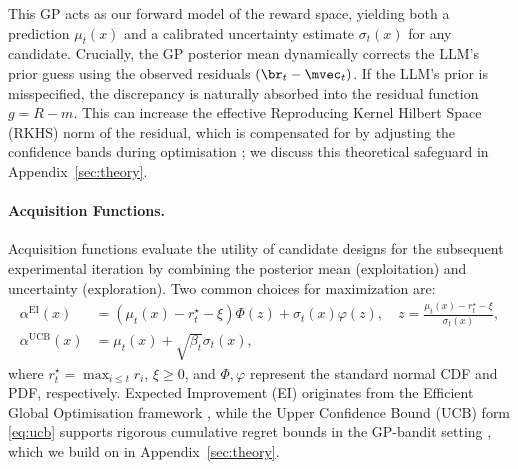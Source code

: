 This GP acts as our forward model of the reward space, yielding both a prediction $\mu_t(x)$ and a calibrated uncertainty estimate $\sigma_t(x)$ for any candidate. Crucially, the GP posterior mean dynamically corrects the LLM’s prior guess using the observed residuals $(\br_t - \mvec_t)$. If the LLM’s prior is misspecified, the discrepancy is naturally absorbed into the residual function $g = R - m$. This can increase the effective Reproducing Kernel Hilbert Space (RKHS) norm of the residual, which is compensated for by adjusting the confidence bands during optimisation \citep{srinivas2010gaussian,chowdhury2017kernelized}; we discuss this theoretical safeguard in Appendix~\ref{sec:theory}.

\paragraph{Acquisition Functions.}
Acquisition functions evaluate the utility of candidate designs for the subsequent experimental iteration by combining the posterior mean (exploitation) and uncertainty (exploration). Two common choices for maximization are:
\begin{align}
\alpha^{\mathrm{EI}}(x) &= (\mu_t(x) - r_t^\star - \xi) \Phi(z) + \sigma_t(x) \varphi(z),
   \quad z = \tfrac{\mu_t(x) - r_t^\star - \xi}{\sigma_t(x)}, \label{eq:ei}\\
\alpha^{\mathrm{UCB}}(x) &= \mu_t(x) + \sqrt{\beta_t} \sigma_t(x), \label{eq:ucb}
\end{align}
where $r_t^\star = \max_{i \le t} r_i$, $\xi \ge 0$, and $\Phi, \varphi$ represent the standard normal CDF and PDF, respectively. Expected Improvement (EI) originates from the Efficient Global Optimisation framework \citep{jonesEfficientGlobalOptimization1998}, while the Upper Confidence Bound (UCB) form \eqref{eq:ucb} supports rigorous cumulative regret bounds in the GP-bandit setting \citep{srinivas2010gaussian}, which we build on in Appendix~\ref{sec:theory}.